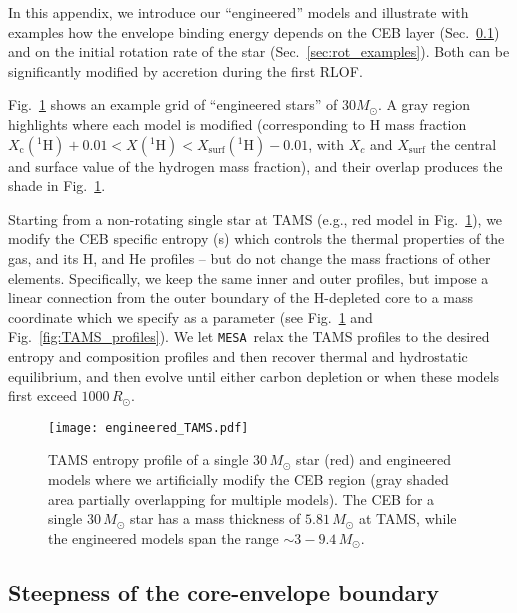 \documentclass[twocolumn,twocolappendix,trackchanges]{aastex63}
\newcommand{\code}[1]{\texttt{#1}}
\newcommand{\mesa}{\code{MESA}}
\DeclareRobustCommand{\Figref}[1]{Fig.~\ref{#1}}
\DeclareRobustCommand{\Secref}[1]{Sec.~\ref{#1}}
\begin{document}
In this appendix, we introduce our ``engineered'' models and
illustrate with examples how the
envelope binding energy depends on the CEB layer
(\Secref{sec:eng_examples}) and on the initial rotation rate of the
star (\Secref{sec:rot_examples}). Both can be significantly modified
by accretion during the first RLOF.

\Figref{fig:engineered_TAMS} shows an example grid of ``engineered
stars'' of $30M_\odot$. A gray region highlights where each
model is modified (corresponding to H mass fraction
$X_\mathrm{c}(^1\mathrm{H})+0.01<X(^1\mathrm{H})<X_\mathrm{surf}(^1\mathrm{H})-0.01$,
with $X_c$ and $X_\mathrm{surf}$ the central and surface value of the
hydrogen mass fraction), and their overlap produces the shade in
\Figref{fig:engineered_TAMS}.

Starting from a non-rotating single star at TAMS (e.g., red model in
\Figref{fig:engineered_TAMS}), we modify the CEB specific entropy (s)
which controls the thermal properties of the gas, and its H, and He
profiles -- but do not change the mass fractions of other elements.
Specifically, we keep the same inner and outer profiles, but impose a
linear connection from the outer boundary of the H-depleted core to a
mass coordinate which we specify as a parameter (see
\Figref{fig:engineered_TAMS} and \Figref{fig:TAMS_profiles}). We let \mesa\ relax
the TAMS profiles to the desired entropy and composition profiles and
then recover thermal and hydrostatic equilibrium, and then evolve
until either carbon depletion or when these models first exceed
$1000\,R_\odot$.


\begin{figure}[btp]
  \texttt{[image: engineered\_TAMS.pdf]}
  \caption{TAMS entropy profile of a single 30\,$M_\odot$ star (red)
    and engineered models where we artificially modify the CEB region
    (gray shaded area partially overlapping for multiple models). The CEB for a
    single $30\,M_\odot$ star has a mass thickness of $5.81\,M_\odot$ at TAMS,
    while the engineered models span the range $\sim3-9.4\,M_\odot$.}
  \label{fig:engineered_TAMS}
\end{figure}


\subsection{Steepness of the core-envelope boundary}
\label{sec:eng_examples}
\end{document}
